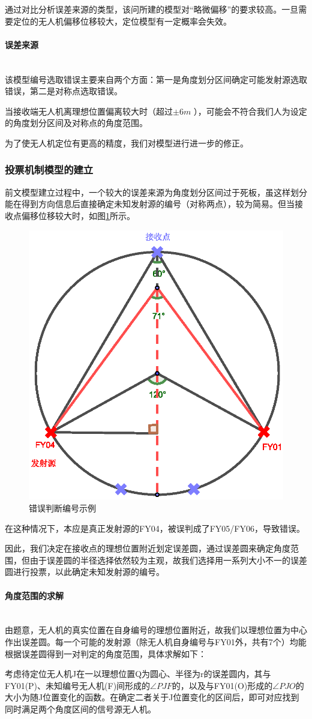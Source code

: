 \documentclass{ctexart}
\newcommand{\subsubsubsection}[1]{\paragraph{#1}\mbox{}\\}
\begin{document}
  通过对比分析误差来源的类型，该问所建的模型对“略微偏移”的要求较高。一旦需要定位的无人机偏移位移较大，定位模型有一定概率会失效。

  \subsubsubsection{误差来源}

  该模型编号选取错误主要来自两个方面：第一是角度划分区间确定可能发射源选取错误，第二是对称点选取错误。

  当接收端无人机离理想位置偏离较大时（超过$\pm 6m$ ），可能会不符合我们人为设定的角度划分区间及对称点的角度范围。

  为了使无人机定位有更高的精度，我们对模型进行进一步的修正。

  \subsubsection{投票机制模型的建立}

  前文模型建立过程中，一个较大的误差来源为角度划分区间过于死板，虽这样划分能在得到方向信息后直接确定未知发射源的编号（对称两点），较为简易。但当接收点偏移位移较大时，如图\ref{错误判断编号示例}所示。
  
  \begin{figure}[H]
    \centering
    \includegraphics[width=0.35\linewidth]{pic/error.eps}
    \caption{错误判断编号示例}
    \label{错误判断编号示例}
    \end{figure}


  在这种情况下，本应是真正发射源的FY04，被误判成了FY05/FY06，导致错误。
  
  因此，我们决定在接收点的理想位置附近划定误差圆，通过误差圆来确定角度范围，但由于误差圆的半径选择依然较为主观，故我们选择用一系列大小不一的误差圆进行投票，以此确定未知发射源的编号。


  \subsubsubsection{角度范围的求解}

  由题意，无人机的真实位置在自身编号的理想位置附近，故我们以理想位置为中心作出误差圆。每一个可能的发射源（除无人机自身编号与FY01外，共有7个）均能根据误差圆得到一对判定的角度范围，具体求解如下：

  考虑待定位无人机J在一以理想位置Q为圆心、半径为r的误差圆内，其与FY01(P)、未知编号无人机(F)间形成的$\angle PJF$的，以及与FY01(O)形成的$\angle PJO$的大小为随J位置变化的函数。在确定二者关于J位置变化的区间后，即可对应找到同时满足两个角度区间的信号源无人机。
\end{document}
